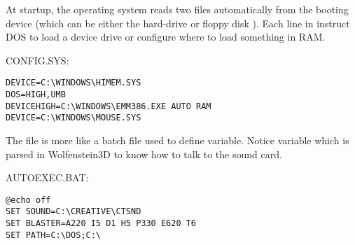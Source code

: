 \documentclass[book.tex]{subfiles}
\begin{document}
At startup, the operating system reads two files automatically from the booting device (which can be either the hard-drive  or floppy disk ). Each line 
in  instruct DOS to load a device drive or configure where to load something in RAM.\\ 
\par
CONFIG.SYS:\\
 \begin{lstlisting}[breaklines=true,breakindent=0em]
DEVICE=C:\WINDOWS\HIMEM.SYS
DOS=HIGH,UMB
DEVICEHIGH=C:\WINDOWS\EMM386.EXE AUTO RAM
DEVICE=C:\WINDOWS\MOUSE.SYS
\end{lstlisting}
\par
The file  is more like a batch file used to define variable. Notice  variable which is parsed in Wolfenstein3D to know how to talk to the sound card.\\
\par
AUTOEXEC.BAT:\\
 \begin{lstlisting}[breaklines=true,breakindent=0em]
@echo off
SET SOUND=C:\CREATIVE\CTSND
SET BLASTER=A220 I5 D1 H5 P330 E620 T6
SET PATH=C:\DOS;C:\ 
\end{lstlisting}
\end{document}
